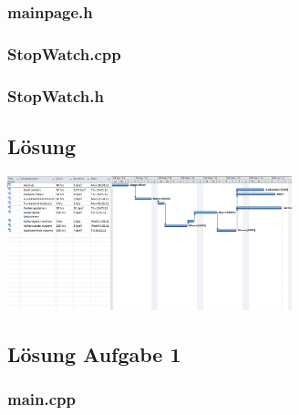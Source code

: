 \subsubsection{mainpage.h}

\subsubsection{StopWatch.cpp}

\subsubsection{StopWatch.h}


\setcounter{section}{7}


\setcounter{section}{8}

\subsection{Lösung}
\begin{center}
	\includegraphics[angle=90,width=0.62\textwidth]{./UebLoesungen/LoesUeb08_pm2/ueb08_loesung.png}
\end{center}


\setcounter{section}{9}


\setcounter{section}{10}


\setcounter{section}{11}

\subsection{Lösung Aufgabe 1}
\subsubsection{main.cpp}

